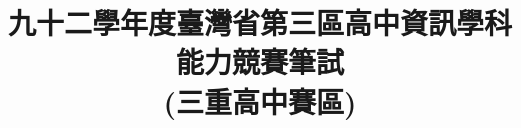 \documentclass[12pt,a4paper]{report}
\begin{document}
\begin{CJK}{UTF8}{bkai}

\renewcommand{\figurename}{圖}
\renewcommand{\tablename}{表}
\renewcommand{\contentsname}{目~錄~}
\renewcommand{\listfigurename}{插~圖~目~錄}
\renewcommand{\listtablename}{表~格~目~錄}
\renewcommand{\appendixname}{附~錄}
\renewcommand{\bibname}{參~考~文~獻}     %
\renewcommand{\indexname}{索~引}
\renewcommand{\today}{\number\year~年~\number\month~月~\number\day~日}

\title{九十二學年度臺灣省第三區高中資訊學科能力競賽筆試\\(三重高中賽區)}
\date{}
\maketitle


\end{CJK}
\end{document}
